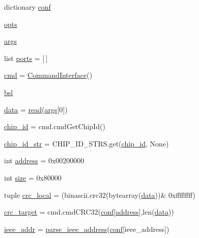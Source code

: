 \begin{DoxyCompactItemize}
\item 
dictionary \hyperlink{namespacecc2538-bsl_a5d82f1abae2dbea8333124323281acf0}{conf}
\item 
\hyperlink{namespacecc2538-bsl_a97724a250c20159cd28af468f4bcf87c}{opts}
\item 
\hyperlink{namespacecc2538-bsl_a8457539981eaac04c795a5924638db10}{args}
\item 
list \hyperlink{namespacecc2538-bsl_a8a91255af8966dcea1e33e65c913e155}{ports} = \mbox{[}$\,$\mbox{]}
\item 
\hyperlink{namespacecc2538-bsl_a1bfa087651c4e938ac35ad3210e5e7bf}{cmd} = \hyperlink{classcc2538-bsl_1_1_command_interface}{Command\+Interface}()
\item 
\hyperlink{namespacecc2538-bsl_ac16fd91d8739889650b3a1f5e9830137}{bsl}
\item 
\hyperlink{namespacecc2538-bsl_a3d688c81e05e22c332b51d3567cb43f7}{data} = \hyperlink{namespacecc2538-bsl_a1c6dc3d541387c959e9d61d8a88863fd}{read}(\hyperlink{namespacecc2538-bsl_a8457539981eaac04c795a5924638db10}{args}\mbox{[}0\mbox{]})
\item 
\hyperlink{namespacecc2538-bsl_a7e101497379303ffcc6d03455e933c88}{chip\+\_\+id} = cmd.\+cmd\+Get\+Chip\+Id()
\item 
\hyperlink{namespacecc2538-bsl_a5bfa5af984735320cff6f78c76c4df5d}{chip\+\_\+id\+\_\+str} = C\+H\+I\+P\+\_\+\+I\+D\+\_\+\+S\+T\+R\+S.\+get(\hyperlink{namespacecc2538-bsl_a7e101497379303ffcc6d03455e933c88}{chip\+\_\+id}, None)
\item 
int \hyperlink{namespacecc2538-bsl_ae601873d3bde248e312fdf16e2d5d01c}{address} = 0x00200000
\item 
int \hyperlink{namespacecc2538-bsl_a19ca7ec3da8c642fa507a248ce5f2ede}{size} = 0x80000
\item 
tuple \hyperlink{namespacecc2538-bsl_a660cdc1441c8f4f079e15d15c5f75418}{crc\+\_\+local} = (binascii.\+crc32(bytearray(\hyperlink{namespacecc2538-bsl_a3d688c81e05e22c332b51d3567cb43f7}{data}))\& 0xffffffff)
\item 
\hyperlink{namespacecc2538-bsl_a6c6ffc33c40576c3092f41a76ea712d3}{crc\+\_\+target} = cmd.\+cmd\+C\+R\+C32(\hyperlink{namespacecc2538-bsl_a5d82f1abae2dbea8333124323281acf0}{conf}\mbox{[}\textquotesingle{}\hyperlink{namespacecc2538-bsl_ae601873d3bde248e312fdf16e2d5d01c}{address}\textquotesingle{}\mbox{]},len(\hyperlink{namespacecc2538-bsl_a3d688c81e05e22c332b51d3567cb43f7}{data}))
\item 
\hyperlink{namespacecc2538-bsl_a9fce00e907fff4ee6b8c5ff384c4e3af}{ieee\+\_\+addr} = \hyperlink{namespacecc2538-bsl_ac6c8e3135ca098d1be447e4ba3973159}{parse\+\_\+ieee\+\_\+address}(\hyperlink{namespacecc2538-bsl_a5d82f1abae2dbea8333124323281acf0}{conf}\mbox{[}\textquotesingle{}ieee\+\_\+address\textquotesingle{}\mbox{]})

\end{DoxyCompactItemize}
